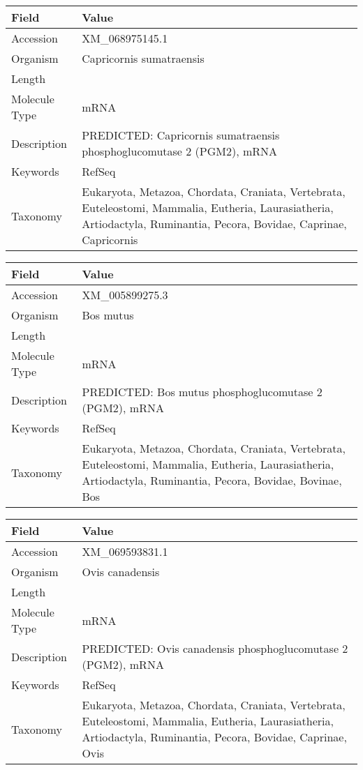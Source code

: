 \documentclass[10pt]{article}
\begin{document}
{\footnotesize
\begin{longtable}{>{\raggedright\arraybackslash}p{4.5cm} >{\raggedright\arraybackslash}p{11.5cm}}
\textbf{Field} & \textbf{Value} \\
\hline
Accession & XM\_068975145.1 \\
Organism & Capricornis sumatraensis \\
Length & 3402 \\
Molecule Type & mRNA \\
Description & PREDICTED: Capricornis sumatraensis phosphoglucomutase 2 (PGM2), mRNA \\
Keywords & RefSeq \\
Taxonomy & Eukaryota, Metazoa, Chordata, Craniata, Vertebrata, Euteleostomi, Mammalia, Eutheria, Laurasiatheria, Artiodactyla, Ruminantia, Pecora, Bovidae, Caprinae, Capricornis \\
\end{longtable}
}

{\footnotesize
\begin{longtable}{>{\raggedright\arraybackslash}p{4.5cm} >{\raggedright\arraybackslash}p{11.5cm}}
\textbf{Field} & \textbf{Value} \\
\hline
Accession & XM\_005899275.3 \\
Organism & Bos mutus \\
Length & 7303 \\
Molecule Type & mRNA \\
Description & PREDICTED: Bos mutus phosphoglucomutase 2 (PGM2), mRNA \\
Keywords & RefSeq \\
Taxonomy & Eukaryota, Metazoa, Chordata, Craniata, Vertebrata, Euteleostomi, Mammalia, Eutheria, Laurasiatheria, Artiodactyla, Ruminantia, Pecora, Bovidae, Bovinae, Bos \\
\end{longtable}
}

{\footnotesize
\begin{longtable}{>{\raggedright\arraybackslash}p{4.5cm} >{\raggedright\arraybackslash}p{11.5cm}}
\textbf{Field} & \textbf{Value} \\
\hline
Accession & XM\_069593831.1 \\
Organism & Ovis canadensis \\
Length & 4203 \\
Molecule Type & mRNA \\
Description & PREDICTED: Ovis canadensis phosphoglucomutase 2 (PGM2), mRNA \\
Keywords & RefSeq \\
Taxonomy & Eukaryota, Metazoa, Chordata, Craniata, Vertebrata, Euteleostomi, Mammalia, Eutheria, Laurasiatheria, Artiodactyla, Ruminantia, Pecora, Bovidae, Caprinae, Ovis \\
\end{longtable}
}
\end{document}
